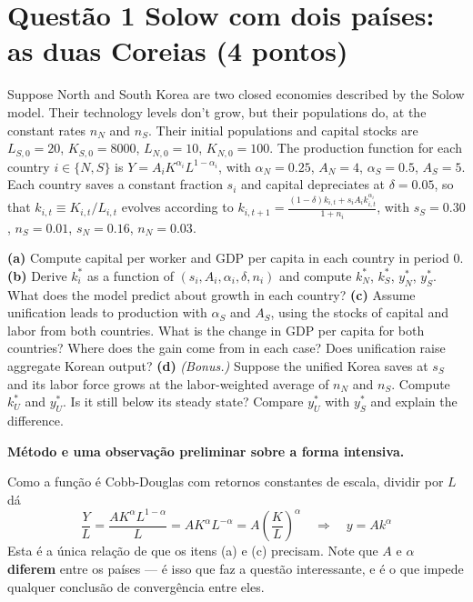 \documentclass[11pt, a4paper]{article}
\newcommand{\passo}[1]{\medskip\noindent\textbf{#1}\par\nobreak}
\begin{document}
\section[Questão 1 --- Solow com dois países: as duas Coreias]{Questão 1 \quad Solow com dois países: as duas Coreias \hfill \normalsize (4 pontos)}

\begin{tcolorbox}[questionbox]
\small
Suppose North and South Korea are two closed economies described by the Solow model. Their
technology levels don't grow, but their populations do, at the constant rates $n_N$ and
$n_S$. Their initial populations and capital stocks are $L_{S,0}=20$, $K_{S,0}=8000$,
$L_{N,0}=10$, $K_{N,0}=100$. The production function for each country $i \in \{N,S\}$ is
$Y = A_i K^{\alpha_i} L^{1-\alpha_i}$, with $\alpha_N = 0.25$, $A_N = 4$, $\alpha_S = 0.5$,
$A_S = 5$. Each country saves a constant fraction $s_i$ and capital depreciates at
$\delta = 0.05$, so that $k_{i,t} \equiv K_{i,t}/L_{i,t}$ evolves according to
$k_{i,t+1} = \frac{(1-\delta)k_{i,t} + s_i A_i k_{i,t}^{\alpha_i}}{1+n_i}$, with
$s_S = 0.30$, $n_S = 0.01$, $s_N = 0.16$, $n_N = 0.03$.

\smallskip
\textbf{(a)} Compute capital per worker and GDP per capita in each country in period 0.
\textbf{(b)} Derive $k^{\ast}_i$ as a function of $(s_i, A_i, \alpha_i, \delta, n_i)$ and
compute $k^{\ast}_N$, $k^{\ast}_S$, $y^{\ast}_N$, $y^{\ast}_S$. What does the model predict
about growth in each country? \textbf{(c)} Assume unification leads to production with
$\alpha_S$ and $A_S$, using the stocks of capital and labor from both countries. What is the
change in GDP per capita for both countries? Where does the gain come from in each case?
Does unification raise aggregate Korean output? \textbf{(d)} \textit{(Bonus.)} Suppose the
unified Korea saves at $s_S$ and its labor force grows at the labor-weighted average of
$n_N$ and $n_S$. Compute $k^{\ast}_U$ and $y^{\ast}_U$. Is it still below its steady state?
Compare $y^{\ast}_U$ with $y^{\ast}_S$ and explain the difference.
\end{tcolorbox}

\passo{Método e uma observação preliminar sobre a forma intensiva.}
Como a função é Cobb-Douglas com retornos constantes de escala, dividir por $L$ dá
$$\frac{Y}{L} = \frac{A K^{\alpha} L^{1-\alpha}}{L}
= A K^{\alpha} L^{-\alpha} = A\left(\frac{K}{L}\right)^{\alpha}
\quad\Longrightarrow\quad \boxed{y = A k^{\alpha}}$$
Esta é a única relação de que os itens (a) e (c) precisam. Note que $A$ e $\alpha$
\textbf{diferem} entre os países --- é isso que faz a questão interessante, e é o que
impede qualquer conclusão de convergência entre eles.
\end{document}
